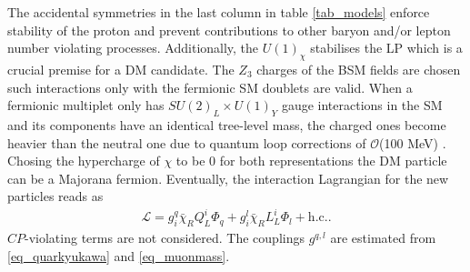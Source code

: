 The accidental symmetries in the last column in table \ref{tab_models}
enforce stability of the proton and prevent contributions to other baryon and/or lepton number violating
processes. Additionally, the $U(1)_\chi$ stabilises the LP which is a crucial premise for a DM candidate. The $Z_3$ charges of the BSM fields are
chosen such interactions only with the fermionic SM doublets are valid.
When a fermionic multiplet only has $SU(2)_L\times U(1)_Y$ gauge interactions in the SM and its components have an identical tree-level mass, the charged 
ones become heavier than the neutral one due to quantum loop corrections of $\mathcal{O}$(100 MeV) \cite{Hisano}\cite{minMatter}. Chosing 
the hypercharge of $\chi$ to be 0 for both representations the DM particle can be a Majorana fermion. Eventually, 
the interaction Lagrangian for the new particles reads as
\begin{align}
 \mathcal{L} = g_i^q \bar \chi_R Q_L^i \Phi_q + g_i^l \bar \chi_R L_L^i \Phi_l + \text{h.c.}.
 \label{eq_modelLagrangian}
\end{align}
$CP$-violating terms are not considered. The couplings $g^{q,l}$ are estimated from \eqref{eq_quarkyukawa} and \eqref{eq_muonmass}.